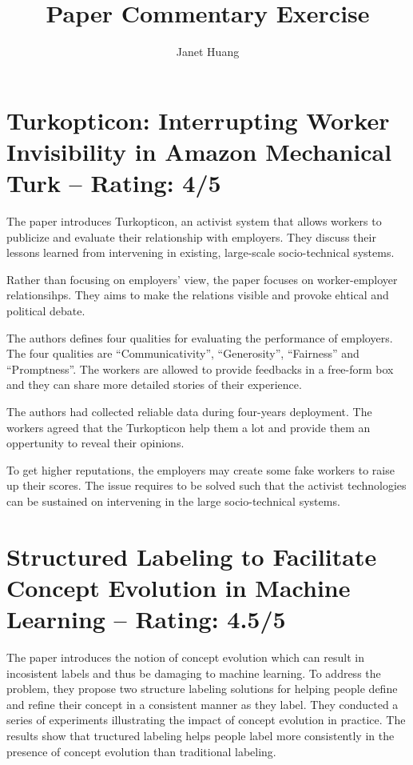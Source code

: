 \documentclass[a4paper]{article}
\title{Paper Commentary Exercise}
\author{Janet Huang}
\begin{document}
\maketitle

\section{Turkopticon: Interrupting Worker Invisibility in Amazon Mechanical Turk -- Rating: 4/5}
The paper \cite{Irani2013} introduces Turkopticon, an activist system that allows workers to publicize and evaluate their relationship with employers. They discuss their lessons learned from intervening in existing, large-scale socio-technical systems.

Rather than focusing on employers' view, the paper focuses on worker-employer relationsihps. They aims to make the relations visible and provoke ehtical and political debate.

The authors defines four qualities for evaluating the performance of employers. The four qualities are ``Communicativity'', ``Generosity'', ``Fairness'' and ``Promptness''. The workers are allowed to provide feedbacks in a free-form box and they can share more detailed stories of their experience.

The authors had collected reliable data during four-years deployment. The workers agreed that the Turkopticon help them a lot and provide them an oppertunity to reveal their opinions.

To get higher reputations, the employers may create some fake workers to raise up their scores. The issue requires to be solved such that the activist technologies can be sustained on intervening in the large socio-technical systems.


\section{Structured Labeling to Facilitate Concept Evolution in Machine Learning -- Rating: 4.5/5}
The paper \cite{Kulesza2014} introduces the notion of concept evolution which can result in incosistent labels and thus be damaging to machine learning. To address the problem, they propose two structure labeling solutions for helping people define and refine their concept in a consistent manner as they label. They conducted a series of experiments illustrating the impact of concept evolution in practice. The results show that tructured labeling helps people label more consistently in the presence of concept evolution than traditional labeling.
\end{document}
